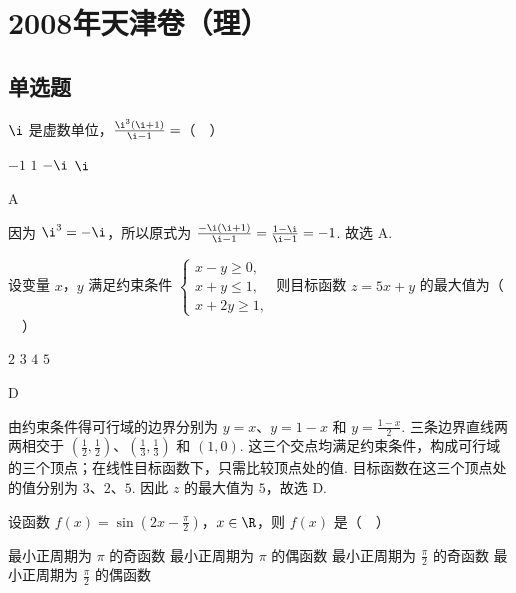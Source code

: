\chapter{2008年天津卷（理）}

\section{单选题}

\begin{problem}
\(\i\) 是虚数单位，\( \frac{\i^{3}(\i+1)}{\i-1}= \)（\(\quad\)）

\choices
    {\(-1\)}
    {\(1\)}
    {\(-\i\)}
    {\(\i\)}
\end{problem}

\begin{answer}
A
\end{answer}

\begin{solution}
因为 \(\i^3=-\i\)，所以原式为 \(\frac{-\i(\i+1)}{\i-1}=\frac{1-\i}{\i-1}=-1\).
故选 A.
\end{solution}

\begin{problem}
设变量 \(x\)，\(y\) 满足约束条件 \(\begin{cases}
x - y \geqslant 0,\\
x + y \leqslant 1,\\
x + 2y \geqslant 1,
\end{cases}\) 则目标函数 \(z = 5x + y\) 的最大值为（\(\quad\)）

\choices
    {\(2\)}
    {\(3\)}
    {\(4\)}
    {\(5\)}
\end{problem}

\begin{answer}
D
\end{answer}

\begin{solution}
由约束条件得可行域的边界分别为 \(y=x\)、\(y=1-x\) 和 \(y=\frac{1-x}{2}\). 三条边界直线两两相交于 \(\left(\frac12,\frac12\right)\)、\(\left(\frac13,\frac13\right)\) 和 \((1,0)\). 这三个交点均满足约束条件，构成可行域的三个顶点；在线性目标函数下，只需比较顶点处的值. 目标函数在这三个顶点处的值分别为 \(3\)、\(2\)、\(5\). 因此 \(z\) 的最大值为 \(5\)，故选 D.
\end{solution}

\begin{problem}
设函数 \(f(x) = \sin \left(2x - \frac{\pi}{2}\right)\)，\(x \in \R\)，则 \( f(x) \) 是（\(\quad\)）

\choices
    {最小正周期为 \(\pi\) 的奇函数}
    {最小正周期为 \(\pi\) 的偶函数}
    {最小正周期为 \(\frac{\pi}{2}\) 的奇函数}
    {最小正周期为 \(\frac{\pi}{2}\) 的偶函数}
\end{problem}

